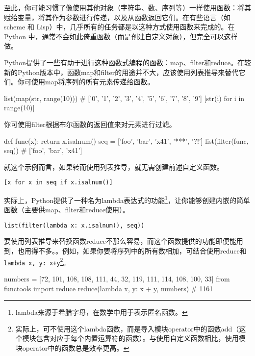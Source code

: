 \begin{tcolorbox}[title=函数式编程, breakable]
    至此，你可能习惯了像使用其他对象（字符串、数、序列等）一样使用函数：将其赋给变量，将其作为参数进行传递，以及从函数返回它们。在有些语言（如 scheme 和 Lisp）中，几乎所有的任务都是以这种方式使用函数来完成的。在 Python 中，通常不会如此倚重函数（而是创建自定义对象），但完全可以这样做。

    Python提供了一些有助于进行这种函数式编程的函数：map、filter和reduce。在较新的Python版本中，函数map和filter的用途并不大，应该使用列表推导来替代它们。你可使用map将序列的所有元素传递给函数。
    \begin{pyc}
list(map(str, range(10)))
# ['0', '1', '2', '3', '4', '5', '6', '7', '8', '9']
[str(i) for i in range(10)]
    \end{pyc}

    你可使用filter根据布尔函数的返回值来对元素进行过滤。
    \begin{pyc}
def func(x):
    return x.isalnum()
seq = ['foo', 'bar', 'x41', '***', '?!']
list(filter(func, seq))  # ['foo', 'bar', 'x41']
    \end{pyc}
    
    就这个示例而言，如果转而使用列表推导，就无需创建前述自定义函数。

    \verb|[x for x in seq if x.isalnum()]|

    实际上，Python提供了一种名为lambda表达式的功能\footnote{lambda来源于希腊字母，在数学中用于表示匿名函数。}，让你能够创建内嵌的简单函数（主要供map、filter和reduce使用）。

    \verb|list(filter(lambda x: x.isalnum(), seq))|

    要使用列表推导来替换函数reduce不那么容易，而这个函数提供的功能即便能用到，也用得不多。。例如，如果你要将序列中的所有数相加，可结合使用reduce和\verb|lambda x, y: x+y|\footnote{实际上，可不使用这个lambda函数，而是导入模块operator中的函数add（这个模块包含对应于每个内置运算符的函数）。与使用自定义函数相比，使用模块operator中的函数总是效率更高。}。

    \begin{pyc}
numbers = [72, 101, 108, 108, 111, 44, 32, 119, 111, 114, 108, 100, 33]
from functools import reduce
reduce(lambda x, y: x + y, numbers)  # 1161
    \end{pyc}
\end{tcolorbox}
